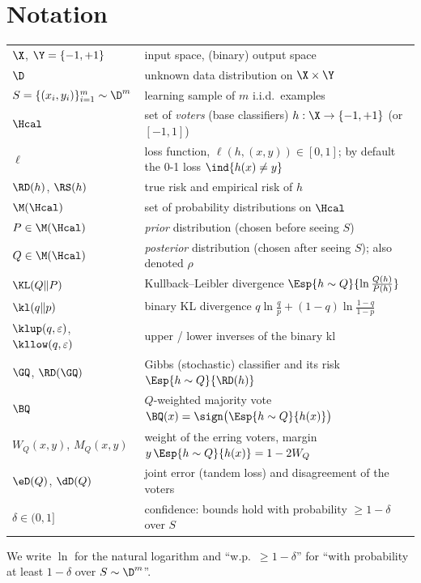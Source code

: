 \documentclass[11pt,a4paper]{article}
\numberwithin{equation}{section}
\begin{document}
\section*{Notation}
\begin{center}
\renewcommand{\arraystretch}{1.22}
\small
\begin{tabular}{p{3.6cm}p{10cm}}
\toprule
$\X$, $\Y=\{-1,+1\}$ & input space, (binary) output space \\
$\D$ & unknown data distribution on $\X\times\Y$ \\
$S=\{(x_i,y_i)\}_{i=1}^m\sim\D^m$ & learning sample of $m$ i.i.d.\ examples \\
$\Hcal$ & set of \emph{voters} (base classifiers) $h:\X\to\{-1,+1\}$ (or $[-1,1]$) \\
$\ell$ & loss function, $\ell(h,(x,y))\in[0,1]$; by default the 0-1 loss $\ind{h(x)\neq y}$ \\
$\RD(h)$, $\RS(h)$ & true risk and empirical risk of $h$ \\
$\M(\Hcal)$ & set of probability distributions on $\Hcal$ \\
$P\in\M(\Hcal)$ & \emph{prior} distribution (chosen before seeing $S$) \\
$Q\in\M(\Hcal)$ & \emph{posterior} distribution (chosen after seeing $S$); also denoted $\rho$ \\
$\KL(Q\|P)$ & Kullback--Leibler divergence $\Esp{h\sim Q}{\ln\frac{Q(h)}{P(h)}}$ \\
$\kl(q\|p)$ & binary KL divergence $q\ln\frac qp+(1-q)\ln\frac{1-q}{1-p}$ \\
$\klup(q,\varepsilon)$, $\kllow(q,\varepsilon)$ & upper / lower inverses of the binary kl \\
$\GQ$, $\RD(\GQ)$ & Gibbs (stochastic) classifier and its risk $\Esp{h\sim Q}{\RD(h)}$ \\
$\BQ$ & $Q$-weighted majority vote $\BQ(x)=\sign\big(\Esp{h\sim Q}{h(x)}\big)$ \\
$W_Q(x,y)$, $M_Q(x,y)$ & weight of the erring voters, margin $y\,\Esp{h\sim Q}{h(x)}=1-2W_Q$ \\
$\eD(Q)$, $\dD(Q)$ & joint error (tandem loss) and disagreement of the voters \\
$\delta\in(0,1]$ & confidence: bounds hold with probability $\geq1-\delta$ over $S$ \\
\bottomrule
\end{tabular}
\end{center}
We write $\ln$ for the natural logarithm and ``w.p.\ $\geq1-\delta$'' for
``with probability at least $1-\delta$ over $S\sim\D^m$''.
\end{document}
